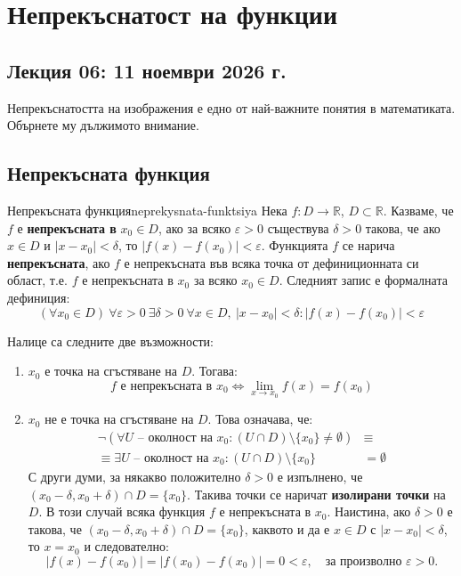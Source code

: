 \chapter{Непрекъснатост на функции}

\section*{Лекция 06: 11 ноември 2026 г.}

Непрекъснатостта на изображения е едно от най-важните понятия в математиката. Обърнете му дължимото внимание.

\section{Непрекъсната функция}
\begin{definition}{Непрекъсната функция}{neprekysnata-funktsiya}
Нека $f : D \to \mathbb{R}$, $D \subset \mathbb{R}$. Казваме, че $f$ е \textbf{непрекъсната в} $x_0 \in D$, ако за всяко $\varepsilon > 0$ съществува $\delta > 0$ такова, че ако $x \in D$ и $|x - x_0| < \delta$, то $|f(x) - f(x_0)| < \varepsilon$. Функцията $f$ се нарича \textbf{непрекъсната}, ако $f$ е непрекъсната във всяка точка от дефиниционната си област, т.е. $f$ е непрекъсната в $x_0$ за всяко $x_0 \in D$. Следният запис е формалната дефиниция:
\[
(\forall x_0 \in D)\ \forall \varepsilon > 0\ \exists \delta > 0\ \forall x \in D,\ |x - x_0| < \delta : |f(x) - f(x_0)| < \varepsilon
\]
\end{definition}

Налице са следните две възможности:
\begin{enumerate}
    \item $x_0$ е точка на сгъстяване на $D$. Тогава:
    \[
    f \text{ е непрекъсната в } x_0 \iff \lim_{x \to x_0} f(x) = f(x_0)
    \]
    \item $x_0$ не е точка на сгъстяване на $D$. Това означава, че:
    \begin{align*}
    \neg (\forall U \text{ -- околност на } x_0 : (U \cap D) \setminus \{x_0\} \neq \emptyset) &\equiv \\
    \equiv \exists U \text{ -- околност на } x_0 : (U \cap D) \setminus \{x_0\} &= \emptyset
    \end{align*}
    С други думи, за някакво положително $\delta > 0$ е изпълнено, че $(x_0 - \delta, x_0 + \delta) \cap D = \{x_0\}$. Такива точки се наричат \textbf{изолирани точки} на $D$. В този случай всяка функция $f$ е непрекъсната в $x_0$. Наистина, ако $\delta > 0$ е такова, че $(x_0 - \delta, x_0 + \delta) \cap D = \{x_0\}$, каквото и да е $x \in D$ с $|x - x_0| < \delta$, то $x = x_0$ и следователно:
    \[
    |f(x) - f(x_0)| = |f(x_0) - f(x_0)| = 0 < \varepsilon, \quad \text{за произволно } \varepsilon > 0.
    \]
\end{enumerate}

